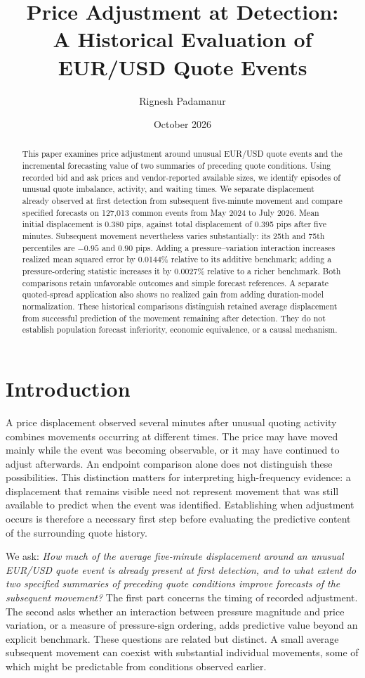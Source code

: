 \documentclass[12pt,letterpaper]{article}
\title{Price Adjustment at Detection:\\A Historical Evaluation of EUR/USD Quote Events}
\author{Rignesh Padamanur}
\date{October 2026}
\begin{document}
\maketitle
\begin{abstract}
This paper examines price adjustment around unusual EUR/USD quote events and the incremental forecasting value of two summaries of preceding quote conditions. Using recorded bid and ask prices and vendor-reported available sizes, we identify episodes of unusual quote imbalance, activity, and waiting times. We separate displacement already observed at first detection from subsequent five-minute movement and compare specified forecasts on 127,013 common events from May 2024 to July 2026. Mean initial displacement is 0.380 pips, against total displacement of 0.395 pips after five minutes. Subsequent movement nevertheless varies substantially: its 25th and 75th percentiles are $-0.95$ and $0.90$ pips. Adding a pressure--variation interaction increases realized mean squared error by 0.0144\% relative to its additive benchmark; adding a pressure-ordering statistic increases it by 0.0027\% relative to a richer benchmark. Both comparisons retain unfavorable outcomes and simple forecast references. A separate quoted-spread application also shows no realized gain from adding duration-model normalization. These historical comparisons distinguish retained average displacement from successful prediction of the movement remaining after detection. They do not establish population forecast inferiority, economic equivalence, or a causal mechanism.
\end{abstract}

\section{Introduction}\label{sec:intro}
A price displacement observed several minutes after unusual quoting activity combines movements occurring at different times. The price may have moved mainly while the event was becoming observable, or it may have continued to adjust afterwards. An endpoint comparison alone does not distinguish these possibilities. This distinction matters for interpreting high-frequency evidence: a displacement that remains visible need not represent movement that was still available to predict when the event was identified. Establishing when adjustment occurs is therefore a necessary first step before evaluating the predictive content of the surrounding quote history.

We ask: \emph{How much of the average five-minute displacement around an unusual EUR/USD quote event is already present at first detection, and to what extent do two specified summaries of preceding quote conditions improve forecasts of the subsequent movement?} The first part concerns the timing of recorded adjustment. The second asks whether an interaction between pressure magnitude and price variation, or a measure of pressure-sign ordering, adds predictive value beyond an explicit benchmark. These questions are related but distinct. A small average subsequent movement can coexist with substantial individual movements, some of which might be predictable from conditions observed earlier.
\end{document}

